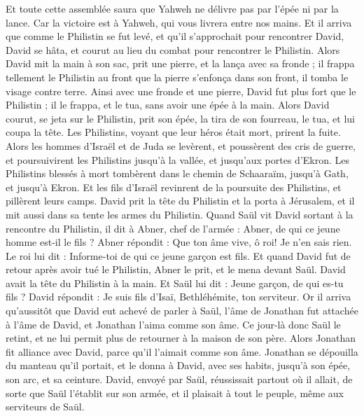 \begin{multicols}{2}
Et toute cette assemblée saura que Yahweh ne délivre pas par l'épée ni par la lance. Car la victoire est à Yahweh, qui vous livrera entre nos mains.
Et il arriva que comme le Philistin se fut levé, et qu'il s'approchait pour rencontrer David, David se hâta, et courut au lieu du combat pour rencontrer le Philistin.
Alors David mit la main à son sac, prit une pierre, et la lança avec sa fronde ; il frappa tellement le Philistin au front que la pierre s'enfonça dans son front, il tomba le visage contre terre.
Ainsi avec une fronde et une pierre, David fut plus fort que le Philistin ; il le frappa, et le tua, sans avoir une épée à la main.
Alors David courut, se jeta sur le Philistin, prit son épée, la tira de son fourreau, le tua, et lui coupa la tête. Les Philistins, voyant que leur héros était mort, prirent la fuite.
Alors les hommes d'Israël et de Juda se levèrent, et poussèrent des cris de guerre, et poursuivirent les Philistins jusqu'à la vallée, et jusqu'aux portes d'Ekron. Les Philistins blessés à mort tombèrent dans le chemin de Schaaraïm, jusqu'à Gath, et jusqu'à Ekron.
Et les fils d'Israël revinrent de la poursuite des Philistins, et pillèrent leurs camps.
David prit la tête du Philistin et la porta à Jérusalem, et il mit aussi dans sa tente les armes du Philistin.
Quand Saül vit David sortant à la rencontre du Philistin, il dit à Abner, chef de l'armée : Abner, de qui ce jeune homme est-il le fils ? Abner répondit : Que ton âme vive, ô roi! Je n'en sais rien.
Le roi lui dit : Informe-toi de qui ce jeune garçon est fils.
Et quand David fut de retour après avoir tué le Philistin, Abner le prit, et le mena devant Saül. David avait la tête du Philistin à la main.
Et Saül lui dit : Jeune garçon, de qui es-tu fils ? David répondit : Je suis fils d'Isaï, Bethléhémite, ton serviteur.
\VerseOne{}Or il arriva qu'aussitôt que David eut achevé de parler à Saül, l'âme de Jonathan fut attachée à l'âme de David, et Jonathan l'aima comme son âme.
Ce jour-là donc Saül le retint, et ne lui permit plus de retourner à la maison de son père.
Alors Jonathan fit alliance avec David, parce qu'il l'aimait comme son âme.
Jonathan se dépouilla du manteau qu'il portait, et le donna à David, avec ses habits, jusqu'à son épée, son arc, et sa ceinture.
David, envoyé par Saül, réussissait partout où il allait, de sorte que Saül l'établit sur son armée, et il plaisait à tout le peuple, même aux serviteurs de Saül.

\end{multicols}
